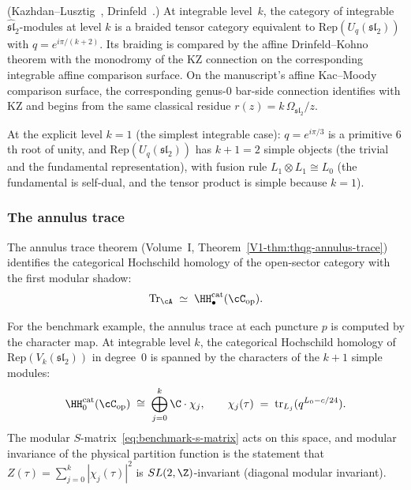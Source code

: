 \begin{proposition}
\label{prop:benchmark-line-operators}
\textup{(Kazhdan--Lusztig~\cite{KL93},
Drinfeld~\cite{Dri89}.)}
At integrable level~$k$, the category of integrable
$\widehat{\mathfrak{sl}}_2$-modules at level $k$ is
a braided tensor category equivalent to
$\mathrm{Rep}(U_q(\mathfrak{sl}_2))$ with $q = e^{i\pi/(k+2)}$.
Its braiding is compared by the affine Drinfeld--Kohno theorem
with the monodromy of the KZ connection on the corresponding
integrable affine comparison surface.
On the manuscript's affine Kac--Moody comparison surface, the
corresponding genus-$0$ bar-side connection identifies with KZ and
begins from the same classical residue
$r(z) = k\,\Omega_{\mathfrak{sl}_2}/z$.
\end{proposition}

At the explicit level $k = 1$ (the simplest integrable case):
$q = e^{i\pi/3}$ is a primitive $6$th root of unity,
and $\mathrm{Rep}(U_q(\mathfrak{sl}_2))$ has
$k + 1 = 2$ simple objects (the trivial and the fundamental
representation), with fusion rule $L_1 \otimes L_1 \cong L_0$
(the fundamental is self-dual, and the tensor product is
simple because $k = 1$).


\subsubsection{The annulus trace}
\label{subsubsec:benchmark-annulus-trace}

The annulus trace theorem
(Volume~I, Theorem~\ref*{V1-thm:thqg-annulus-trace}) identifies the
categorical Hochschild homology of the open-sector category with the first
modular shadow:
\begin{equation}\label{eq:benchmark-annulus-trace}
 \mathrm{Tr}_\cA
 \;\simeq\;
 \HH^{\mathrm{cat}}_\bullet(\cC_{\mathrm{op}}).
\end{equation}

For the benchmark example, the annulus trace at each puncture
$p$ is computed by the character map.
At integrable level $k$, the categorical Hochschild homology of
$\mathrm{Rep}(V_k(\mathfrak{sl}_2))$ in degree~$0$ is spanned
by the characters of the $k + 1$ simple modules:
\begin{equation}\label{eq:benchmark-characters}
 \HH^{\mathrm{cat}}_0(\cC_{\mathrm{op}})
 \;\cong\;
 \bigoplus_{j=0}^k \C \cdot \chi_j,
 \qquad
 \chi_j(\tau)
 \;=\;
 \mathrm{tr}_{L_j}(q^{L_0 - c/24}).
\end{equation}
The modular $S$-matrix~\eqref{eq:benchmark-s-matrix} acts on this
space, and modular invariance of the physical partition function
is the statement that $Z(\tau) = \sum_{j=0}^k |\chi_j(\tau)|^2$
is $SL(2,\Z)$-invariant (diagonal modular invariant).

